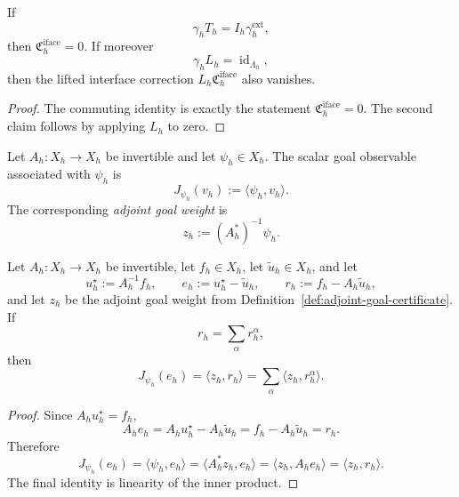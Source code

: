 \begin{theorem}
\label{thm:commuting-interface-diagrams-kill-interface-crime}
If
\[
\gamma_hT_h=I_h\gamma_h^{\mathrm{ext}},
\]
then \(\mathfrak C_h^{\mathrm{iface}}=0\). If moreover
\[
\gamma_hL_h=\operatorname{id}_{\Lambda_h},
\]
then the lifted interface correction \(L_h\mathfrak C_h^{\mathrm{iface}}\)
also vanishes.
\end{theorem}

\begin{proof}
The commuting identity is exactly the statement
\(\mathfrak C_h^{\mathrm{iface}}=0\). The second claim follows by applying
\(L_h\) to zero.
\end{proof}

\begin{definition}
\label{def:adjoint-goal-certificate}
Let \(A_h:X_h\to X_h\) be invertible and let \(\psi_h\in X_h\). The scalar goal
observable associated with \(\psi_h\) is
\[
J_{\psi_h}(v_h):=\langle \psi_h,v_h\rangle.
\]
The corresponding \emph{adjoint goal weight} is
\[
z_h:=(A_h^\ast)^{-1}\psi_h.
\]
\end{definition}

\begin{theorem}
\label{thm:exact-goal-error-ledger-identity}
Let \(A_h:X_h\to X_h\) be invertible, let \(f_h\in X_h\), let
\(\widetilde u_h\in X_h\), and let
\[
u_h^\star:=A_h^{-1}f_h,
\qquad
e_h:=u_h^\star-\widetilde u_h,
\qquad
r_h:=f_h-A_h\widetilde u_h,
\]
and let \(z_h\) be the adjoint goal weight from
Definition~\ref{def:adjoint-goal-certificate}. If
\[
r_h=\sum_{\alpha} r_h^{\alpha},
\]
then
\[
J_{\psi_h}(e_h)
=
\langle z_h,r_h\rangle
=
\sum_{\alpha}\langle z_h,r_h^{\alpha}\rangle.
\]
\end{theorem}

\begin{proof}
Since \(A_hu_h^\star=f_h\),
\[
A_he_h
=
A_hu_h^\star-A_h\widetilde u_h
=
f_h-A_h\widetilde u_h
=
r_h.
\]
Therefore
\[
J_{\psi_h}(e_h)
=
\langle \psi_h,e_h\rangle
=
\langle A_h^\ast z_h,e_h\rangle
=
\langle z_h,A_he_h\rangle
=
\langle z_h,r_h\rangle.
\]
The final identity is linearity of the inner product.
\end{proof}


